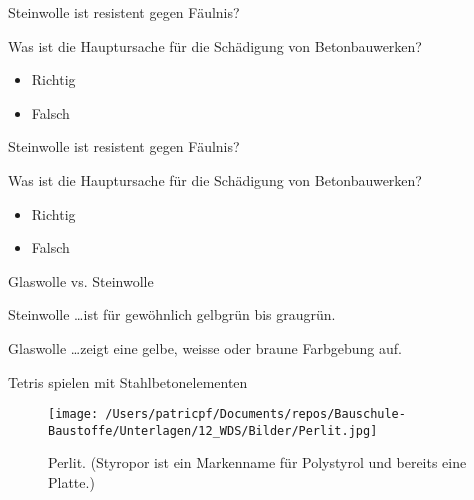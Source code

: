 \begin{frame}{Steinwolle ist resistent gegen Fäulnis?}
    \begin{Fragenblock}
        Was ist die Hauptursache für die Schädigung von Betonbauwerken?
        
        \begin{itemize}
            \item[\faSquare] Richtig
            \item[\faSquare] Falsch
        \end{itemize}
    \end{Fragenblock}
\end{frame}

\begin{frame}{Steinwolle ist resistent gegen Fäulnis?}
    \begin{Fragenblock}
        Was ist die Hauptursache für die Schädigung von Betonbauwerken?
        
        \begin{itemize}
			\item[\textcolor{green!70!black}{\faCheckSquare}] Richtig
			\item[\faSquare] Falsch
        \end{itemize}
    \end{Fragenblock}
\end{frame}


\begin{frame}{Glaswolle vs. Steinwolle}

	\begin{block}{Steinwolle}
		\ldots ist für gewöhnlich gelbgrün bis graugrün.
	\end{block}
	\pause
	\begin{block}{Glaswolle}
		\ldots zeigt eine gelbe, weisse oder braune Farbgebung auf.
	\end{block}
\end{frame}

\begin{frame}{Tetris spielen mit Stahlbetonelementen}

    \begin{figure}[H]
        \centering
        \texttt{[image: /Users/patricpf/Documents/repos/Bauschule-Baustoffe/Unterlagen/12\_WDS/Bilder/Perlit.jpg]}
        \caption{Perlit. (Styropor ist ein Markenname für Polystyrol und bereits eine Platte.)}
    \end{figure}


\end{frame}


